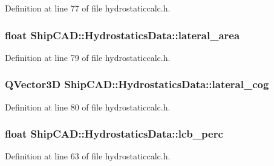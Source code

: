 Definition at line 77 of file hydrostaticcalc.\+h.

\subsubsection[{\texorpdfstring{lateral\+\_\+area}{lateral_area}}]{\setlength{\rightskip}{0pt plus 5cm}float Ship\+C\+A\+D\+::\+Hydrostatics\+Data\+::lateral\+\_\+area}\hypertarget{structShipCAD_1_1HydrostaticsData_a1ba65b28e4351a4d97bc64cd11ddab90}{}\label{structShipCAD_1_1HydrostaticsData_a1ba65b28e4351a4d97bc64cd11ddab90}


Definition at line 79 of file hydrostaticcalc.\+h.

\subsubsection[{\texorpdfstring{lateral\+\_\+cog}{lateral_cog}}]{\setlength{\rightskip}{0pt plus 5cm}Q\+Vector3D Ship\+C\+A\+D\+::\+Hydrostatics\+Data\+::lateral\+\_\+cog}\hypertarget{structShipCAD_1_1HydrostaticsData_adc0c4f2f0c5b110a968e45642dc5eeeb}{}\label{structShipCAD_1_1HydrostaticsData_adc0c4f2f0c5b110a968e45642dc5eeeb}


Definition at line 80 of file hydrostaticcalc.\+h.

\subsubsection[{\texorpdfstring{lcb\+\_\+perc}{lcb_perc}}]{\setlength{\rightskip}{0pt plus 5cm}float Ship\+C\+A\+D\+::\+Hydrostatics\+Data\+::lcb\+\_\+perc}\hypertarget{structShipCAD_1_1HydrostaticsData_a783b71d811732bbc002b52f21d63c83a}{}\label{structShipCAD_1_1HydrostaticsData_a783b71d811732bbc002b52f21d63c83a}


Definition at line 63 of file hydrostaticcalc.\+h.

